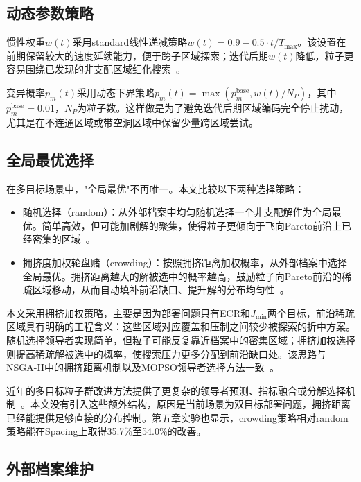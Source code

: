 \subsection{动态参数策略}

惯性权重$w(t)$采用standard线性递减策略$w(t)=0.9-0.5\cdot t/T_{\max}$。该设置在前期保留较大的速度延续能力，便于跨子区域探索；迭代后期$w(t)$降低，粒子更容易围绕已发现的非支配区域细化搜索~\cite{Shi1998}。

变异概率$p_m(t)$采用动态下界策略$p_m(t)=\max(p_m^{\text{base}}, w(t)/N_P)$，其中$p_m^{\text{base}}=0.01$，$N_P$为粒子数。这样做是为了避免迭代后期区域编码完全停止扰动，尤其是在不连通区域或带空洞区域中保留少量跨区域尝试。

\subsection{全局最优选择}

在多目标场景中，"全局最优"不再唯一。本文比较以下两种选择策略：

\begin{itemize}
    \item 随机选择（random）：从外部档案中均匀随机选择一个非支配解作为全局最优。简单高效，但可能加剧解的聚集，使得粒子更倾向于飞向Pareto前沿上已经密集的区域~\cite{Coello2004}。
    \item 拥挤度加权轮盘赌（crowding）：按照拥挤距离加权概率，从外部档案中选择全局最优。拥挤距离越大的解被选中的概率越高，鼓励粒子向Pareto前沿的稀疏区域移动，从而自动填补前沿缺口、提升解的分布均匀性~\cite{Raquel2005}。
\end{itemize}

本文采用拥挤加权策略，主要是因为部署问题只有ECR和$J_{\min}$两个目标，前沿稀疏区域具有明确的工程含义：这些区域对应覆盖和压制之间较少被探索的折中方案。随机选择领导者实现简单，但粒子可能反复靠近档案中的密集区域；拥挤加权选择则提高稀疏解被选中的概率，使搜索压力更多分配到前沿缺口处。该思路与NSGA-II中的拥挤距离机制以及MOPSO领导者选择方法一致~\cite{Deb2002,Raquel2005}。

近年的多目标粒子群改进方法提供了更复杂的领导者预测、指标融合或分解选择机制~\cite{Liu2023,Wang2024,Zhang2024,Xu2024,Sun2024,Ma2025}。本文没有引入这些额外结构，原因是当前场景为双目标部署问题，拥挤距离已经能提供足够直接的分布控制。第五章实验也显示，crowding策略相对random策略能在Spacing上取得35.7\%至54.0\%的改善。

\subsection{外部档案维护}

